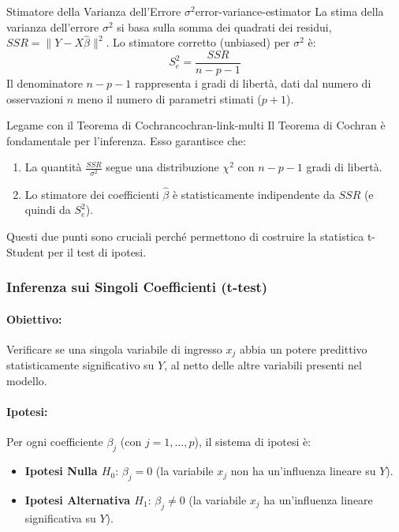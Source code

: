 \begin{definizione}{Stimatore della Varianza dell'Errore
		\(\sigma^2\)}{error-variance-estimator}
	La stima della varianza dell'errore \(\sigma^2\) si basa sulla somma dei
	quadrati dei residui, \(SSR = \|Y - X\hat{\beta}\|^2\). Lo stimatore
	corretto (unbiased) per \(\sigma^2\) è:
	\[
		S_e^2 = \frac{SSR}{n-p-1}
	\]
	Il denominatore \(n-p-1\) rappresenta i gradi di libertà, dati dal numero
	di osservazioni \(n\) meno il numero di parametri stimati (\(p+1\)).
\end{definizione}

\begin{nota}{Legame con il Teorema di Cochran}{cochran-link-multi}
	Il Teorema di Cochran è fondamentale per l'inferenza. Esso garantisce che:
	\begin{enumerate}
		\item La quantità \( \frac{SSR}{\sigma^2} \) segue una distribuzione
		      \(\chi^2\) con \(n-p-1\) gradi di libertà.
		\item Lo stimatore dei coefficienti \(\hat{\beta}\) è statisticamente
		      indipendente da \(SSR\) (e quindi da \(S_e^2\)).
	\end{enumerate}
	Questi due punti sono cruciali perché permettono di costruire la statistica
	t-Student per il test di ipotesi.
\end{nota}

\subsubsection{Inferenza sui Singoli Coefficienti (t-test)}

\paragraph{Obiettivo:} Verificare se una singola variabile di ingresso \(x_j\)
abbia un potere predittivo statisticamente significativo su \(Y\), al netto
delle altre variabili presenti nel modello.

\paragraph{Ipotesi:} Per ogni coefficiente \(\beta_j\) (con \(j=1, \dots, p\)),
il sistema di ipotesi è:
\begin{itemize}
	\item \textbf{Ipotesi Nulla $H_0$}: $\beta_j = 0$ (la variabile \(x_j\) non
	      ha un'influenza lineare su \(Y\)).
	\item \textbf{Ipotesi Alternativa $H_1$}: $\beta_j \neq 0$ (la variabile
	      \(x_j\) ha un'influenza lineare significativa su \(Y\)).
\end{itemize}


